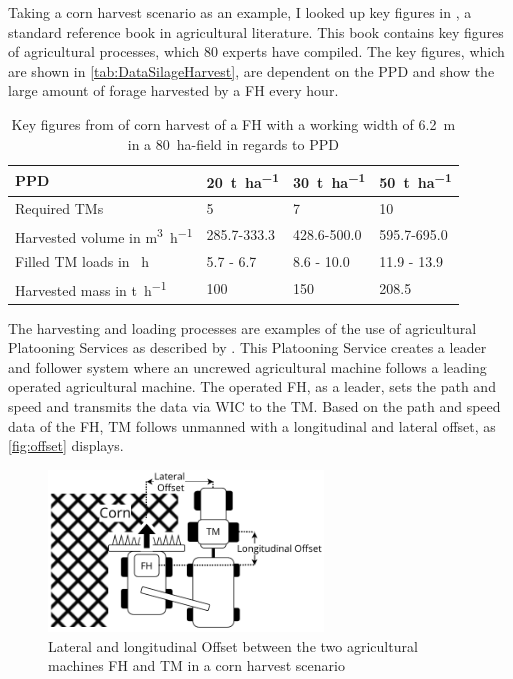 Taking a corn harvest scenario as an example, I looked up key figures in \cite{faustzahlen2018}, a standard reference book in agricultural literature. This book contains key figures of agricultural processes, which 80 experts have compiled. The key figures, which are shown in \autoref{tab:DataSilageHarvest}, are dependent on the \ac{PPD} and show the large amount of forage harvested by a \ac{FH} every hour.
\begin{table}[H]
	\centering
	\begin{tabular}{>{\raggedright}p{4.9cm}p{1.8cm}p{1.8cm}p{1.8cm}}
		\toprule
  		\acf{PPD}&\SI{20}{\tonne\per\hectare}&\SI{30}{\tonne\per\hectare} & \SI{50}{\tonne\per\hectare}\\
		\midrule
		Required \acl{TM}s & \num{5}&
		\num{7} & \num{10} \\
		Harvested volume in \si{\cubic\metre\per\hour} &
		\num{285.7}-\num{333.3}
		& \num{428.6}-\num{500.0} &
		\num{595.7}-\num{695.0}\\
		Filled \acl{TM} loads in \si{\per\hour} &
		\num{5.7} - \num{6.7}
		& \num{8.6} - \num{10.0} &
		\num{11.9} - \num{13.9}\\
		Harvested mass in \si{\tonne\per\hour} & \num{100}
		& \num{150} &
		\num{208.5} \\
		\bottomrule
	\end{tabular}
	\caption{Key figures from \cite{faustzahlen2018} of corn harvest of a \acf{FH} with a working width of \SI{6.2}{\metre} in a \SI{80}{\hectare}-field in regards to \acf{PPD}}
	\label{tab:DataSilageHarvest}
\end{table}

The harvesting and loading processes are examples of the use of agricultural Platooning Services as described by
\textcite{zhang_method_2009}.
This Platooning Service creates a leader and follower system where an uncrewed agricultural machine follows a leading operated agricultural machine.
The operated \ac{FH}, as a leader, sets the path and speed and transmits the data via \ac{WIC} to the \ac{TM}. Based on the path and speed data of the \ac{FH}, \ac{TM} follows unmanned with a longitudinal and lateral offset, as \autoref{fig:offset} displays.
\begin{figure}[H]
	\centering
	\includegraphics[width=0.65\textwidth]{figures/offset_platoon.pdf}
	\caption{Lateral and longitudinal Offset between the two agricultural machines \acf{FH} and \acf{TM} in a corn harvest scenario}%
	\label{fig:offset}%
\end{figure}


